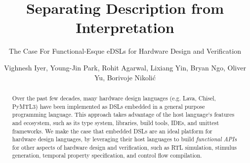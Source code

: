 \documentclass[sigplan,review,nonacm,9pt]{acmart}
\begin{document}
\title{Separating Description from Interpretation}
\subtitle{The Case For Functional-Esque eDSLs for Hardware Design and Verification}


\author{Vighnesh Iyer, Young-Jin Park, Rohit Agarwal, Lixiang Yin, Bryan Ngo, Oliver Yu, Borivoje Nikolić}





\begin{abstract}
Over the past few decades, many hardware design languages (e.g. Lava\cite{lava}, Chisel\cite{chisel}, PyMTL3\cite{pymtl3}) have been implemented as DSLs embedded in a general purpose programming language.
This approach takes advantage of the host language`s features and ecosystem, such as its type system, libraries, build tools, IDEs, and unittest frameworks.
We make the case that embedded DSLs are an ideal platform for hardware design languages, by leveraging their host languages to build \textit{functional APIs} for other aspects of hardware design and verification, such as RTL simulation, stimulus generation, temporal property specification, and control flow compilation.
\end{abstract}
\end{document}

